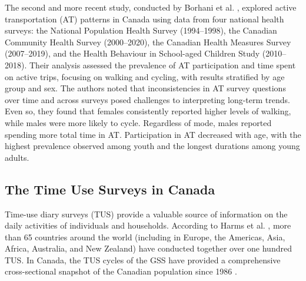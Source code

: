 \documentclass[preprint, 3p,
authoryear]{elsarticle} %
\begin{document}
The second and more recent study, conducted by Borhani et al.
\citeyearpar{borhani2024}, explored active transportation (AT) patterns
in Canada using data from four national health surveys: the National
Population Health Survey (1994--1998), the Canadian Community Health
Survey (2000--2020), the Canadian Health Measures Survey (2007--2019),
and the Health Behaviour in School-aged Children Study (2010--2018).
Their analysis assessed the prevalence of AT participation and time
spent on active trips, focusing on walking and cycling, with results
stratified by age group and sex. The authors noted that inconsistencies
in AT survey questions over time and across surveys posed challenges to
interpreting long-term trends. Even so, they found that females
consistently reported higher levels of walking, while males were more
likely to cycle. Regardless of mode, males reported spending more total
time in AT. Participation in AT decreased with age, with the highest
prevalence observed among youth and the longest durations among young
adults.

\subsection{The Time Use Surveys in
Canada}\label{the-time-use-surveys-in-canada}

Time-use diary surveys (TUS) provide a valuable source of information on
the daily activities of individuals and households. According to Harms
et al. \citeyearpar{harms2018}, more than 65 countries around the world
(including in Europe, the Americas, Asia, Africa, Australia, and New
Zealand) have conducted together over one hundred TUS. In Canada, the
TUS cycles of the GSS have provided a comprehensive cross-sectional
snapshot of the Canadian population since 1986
\citep{statisticscanada2022}.
\end{document}
